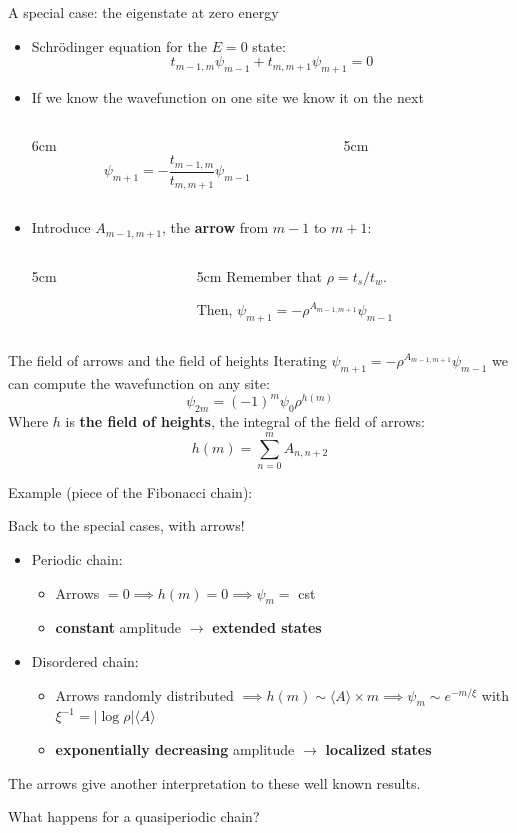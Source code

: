 \documentclass[xcolor=x11names,compress,professionalfonts]{beamer}
\renewcommand{\(}{\begin{columns}}
\renewcommand{\)}{\end{columns}}
\newcommand{\<}[1]{\begin{column}{#1}}
\renewcommand{\>}{\end{column}}
\begin{document}
\begin{frame}{A special case: the eigenstate at zero energy}
\begin{itemize}
	\item Schrödinger equation for the $E=0$ state:
	\[
	t_{m-1,m} \psi_{m-1} + t_{m,m+1}\psi_{m+1} = 0
	\]
	\item If we know the wavefunction on one site we know it on the next
	\begin{columns}
	\<{6cm}
	\[
	\psi_{m+1} = -\frac{t_{m-1,m}}{t_{m,m+1}} \psi_{m-1}
	\]
	\>
	\<{5cm}
	
	\>
	\end{columns}
	\item Introduce $A_{m-1,m+1}$, the \textbf{arrow} from $m-1$ to $m+1$:
	\begin{columns}
	\<{5cm}
	\centering
	 
	 \>
	 \<{5cm}
	 Remember that $\rho = t_s/t_w$.
	 
	Then, $\boxed{\psi_{m+1} =- \rho^{A_{m-1,m+1}} \psi_{m-1}}$
	 \>
	 \end{columns}
\end{itemize}
\end{frame}

\begin{frame}{The field of arrows and the field of heights}
Iterating $\psi_{m+1} =- \rho^{A_{m-1,m+1}} \psi_{m-1}$ we can compute the wavefunction on any site:
\[
	\psi_{2m} = (-1)^{m} \psi_0 \rho^{h(m)}
\]
Where $h$ is \textbf{the field of heights}, the integral of the field of arrows:
\[
	h(m) = \sum_{n=0}^m A_{n, n+2}
\]

Example (piece of the Fibonacci chain):



\end{frame}

\begin{frame}{Back to the special cases, with arrows!}
\begin{itemize}
	\item Periodic chain: 
	
	\begin{itemize}
		\item Arrows $= 0 \implies h(m) = 0 \implies \psi_m = $ cst  
		\item \textbf{constant} amplitude $\rightarrow$ \textbf{extended states}
	\end{itemize}
	\item Disordered chain: 
	
	\begin{itemize}
		\item Arrows randomly distributed $\implies h(m) \sim \langle A \rangle \times m \implies \psi_m \sim e^{- m/\xi}$ with $\xi^{-1} = |\log \rho| \langle A \rangle$
		\item  \textbf{exponentially decreasing} amplitude $\rightarrow$ \textbf{localized states}
	\end{itemize}
\end{itemize}
The arrows give another interpretation to these well known results.

What happens for a quasiperiodic chain?
\end{frame}
\end{document}
